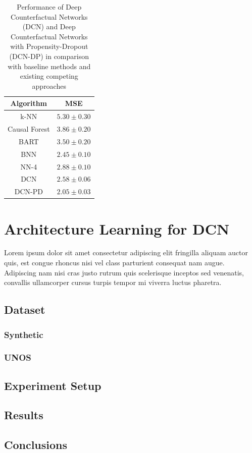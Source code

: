 
\begin{table}[]
	\centering
	\begin{tabular}{@{}cc@{}}
		\toprule
		\textbf{Algorithm} & \textbf{MSE}                \\ \midrule
		k-NN               &   $5.30 \pm 0.30$           \\
		Causal Forest      &   $3.86 \pm 0.20$           \\
		BART               &   $3.50 \pm 0.20$           \\ 
		BNN                &   $2.45 \pm 0.10$           \\
		NN-4                &  $2.88 \pm 0.10$           \\
		DCN                &   $2.58 \pm 0.06$           \\
		DCN-PD             &   $2.05 \pm 0.03$          \\\bottomrule
	\end{tabular}
	\caption{Performance of Deep Counterfactual Networks (DCN) and Deep Counterfactual Networks with Propensity-Dropout (DCN-DP) in comparison with baseline methods and existing competing approaches}\label{tab:dcn-pd-results}
\end{table}


\pagebreak
\section{Architecture Learning for DCN}
Lorem ipsum dolor sit amet consectetur adipiscing elit fringilla aliquam auctor quis, est congue rhoncus nisi vel class parturient consequat nam augue. Adipiscing nam nisi cras justo rutrum quis scelerisque inceptos sed venenatis, convallis ullamcorper cursus turpis tempor mi viverra luctus pharetra.
\subsection{Dataset}
\subsubsection{Synthetic}
\subsubsection{UNOS}

\subsection{Experiment Setup}

\subsection{Results}

\subsection{Conclusions}